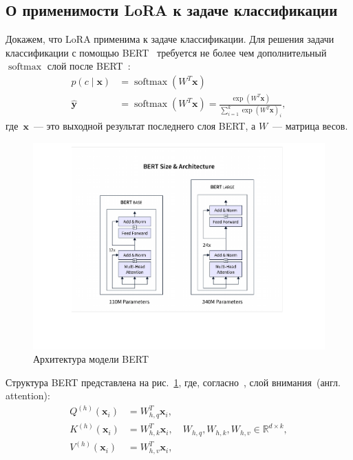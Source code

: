 \subsection{О применимости LoRA к задаче классификации}
Докажем, что LoRA применима к задаче классификации. Для решения задачи классификации с помощью BERT~\cite{vaswani2017attention} требуется не более чем дополнительный~$\operatorname{softmax}$ слой после BERT~\cite{sun2019fine}: 
\begin{equation}
\label{eq:5}
\begin{aligned}
p(c \mid \mathbf{x})&=\operatorname{softmax}(W^T \mathbf{x})\\
\hat{\mathbf{y}}&=\operatorname{softmax}\left(W^T \mathbf{x}\right)=\frac{\exp \left(W^T \mathbf{x}\right)}{\sum_{i=1}^k \exp \left(W^T \mathbf{x}\right)_i},
\end{aligned}
\end{equation}
где~$\mathbf{x}$~--- это выходной результат последнего слоя BERT, а $W$~--- матрица весов.
\begin{figure}[ht!]
    \centering
    \includegraphics[width=1.0\textwidth]{images/bert_architecture copy.pdf}
    \caption{Архитектура модели BERT}
    \label{fig:1}
\end{figure}
Структура BERT представлена на рис.~\ref{fig:1}, где, согласно~\cite{thickstun2021transformer}, слой внимания~(англ. attention):
\begin{equation}
\begin{aligned}
Q^{(h)}\left(\mathbf{x}_i\right)&=W_{h, q}^T \mathbf{x}_i,\\
K^{(h)}\left(\mathbf{x}_i\right)&=W_{h, k}^T \mathbf{x}_i,  \quad W_{h, q}, W_{h, k}, W_{h, v} \in \mathbb{R}^{d \times k},\\
V^{(h)}\left(\mathbf{x}_i\right)&=W_{h, v}^T \mathbf{x}_i,
\end{aligned}
\end{equation}
